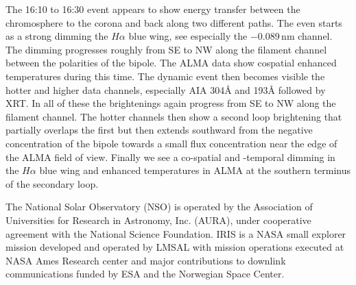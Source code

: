 \documentclass[twocolumn]{aastex62}
\newcommand{\unit}[1]{\ensuremath{\, \mathrm{#1}}}
\newcommand{\halpha}{\ensuremath{H\alpha}}
\begin{document}
The 16:10 to 16:30 event appears to show energy transfer between the chromosphere to the corona and back along two different paths.
The even starts as a strong dimming the \halpha{} blue wing, see especially the $-0.089\unit{nm}$ channel.  
The dimming progresses roughly from SE to NW along the filament channel between the polarities of the bipole.
The ALMA data show cospatial enhanced temperatures during this time.
The dynamic event then becomes visible the hotter and higher data channels, especially AIA 304\AA{} and 193\AA{} followed by XRT.
In all of these the brightenings again progress from SE to NW along the filament channel.
The hotter channels then show a second loop brightening that partially overlaps the first but then extends southward from the negative concentration of the bipole towards a small flux concentration near the edge of the ALMA field of view.
Finally we see a co-spatial and -temporal dimming in the \halpha{} blue wing and enhanced temperatures in ALMA at the southern terminus of the secondary loop. 


\acknowledgments
The National Solar Observatory (NSO) is operated by the Association of Universities for Research in Astronomy, Inc. (AURA), under cooperative agreement with the National Science Foundation.  
IRIS is a NASA small explorer mission developed and operated by LMSAL with mission operations executed at NASA Ames Research center and major contributions to downlink communications funded by ESA and the Norwegian Space Center.


%

\vspace{5mm}

\end{document}
